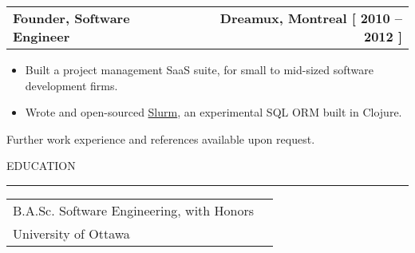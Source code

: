 \documentclass[12pt]{article}
\makeatletter
\newenvironment{justifycolumns}
{\begin{tabular*}{\textwidth}{@{\extracolsep{\fill}} lr@{}}}
{\end{tabular*}}
\newcommand{\row}[2]{#1 & #2 \\}
\newcommand{\rowheading}[2]{\row{\textbf{#1}}{\textbf{#2}}}
\newcommand{\range}[2]{#1 -- #2}
\newcommand{\blockseparation}{\vspace{0.13in}}
\newcommand{\heading}[1]{
	\vspace{0.05in}
	\uppercase{#1}
	\vspace{0.05in}
	\hrule
	\blockseparation
}
\newcommand{\bulletheading}[1]{
	\vspace{0.075in}
	\hspace{0.1in}
	{#1}
	\vspace{0.03in}
}
\newenvironment{tightbullets}
{\begin{itemize}}
{\end{itemize}}
\newenvironment{bullets}
{\begin{tightbullets}}
{\end{tightbullets} \blockseparation}
\makeatother
\begin{document}
\begin{flushleft}
\begin{justifycolumns}
	\hspace{0.1in}
	\rowheading{Founder, Software Engineer}{\textnormal{Dreamux, Montreal [ \range{2010}{2012} ]}}
\end{justifycolumns}
\begin{bullets}
	\item Built a project management SaaS suite, for small to mid-sized software development firms.
	\item Wrote and open-sourced \href{https://github.com/amcnamara/slurm}{Slurm}, an experimental SQL ORM built in Clojure.
\end{bullets}

\bulletheading{\small{Further work experience and references available upon request.}}

\blockseparation

\heading{Education}
\begin{justifycolumns}
	\row{B.A.Sc. Software Engineering, with Honors}{}
	\row{University of Ottawa}{}
\end{justifycolumns}


\end{flushleft}
\end{document}
